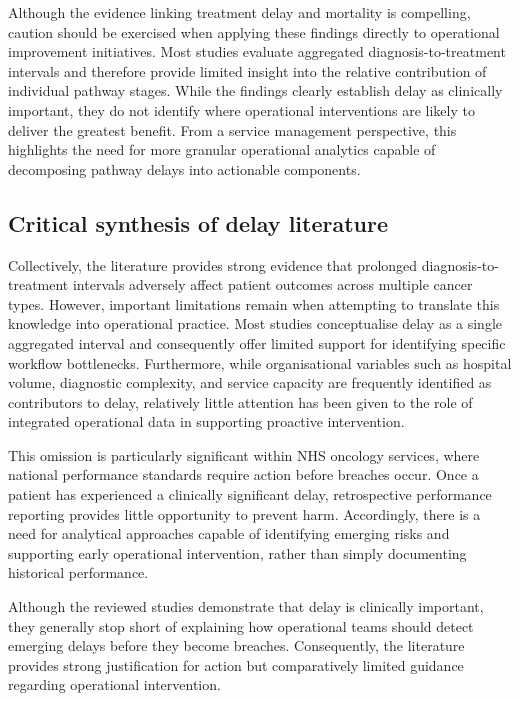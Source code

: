 Although the evidence linking treatment delay and mortality is compelling, caution should be exercised when applying these findings directly to operational improvement initiatives. Most studies evaluate aggregated diagnosis-to-treatment intervals and therefore provide limited insight into the relative contribution of individual pathway stages. While the findings clearly establish delay as clinically important, they do not identify where operational interventions are likely to deliver the greatest benefit. From a service management perspective, this highlights the need for more granular operational analytics capable of decomposing pathway delays into actionable components.

\subsection{Critical synthesis of delay literature}

Collectively, the literature provides strong evidence that prolonged diagnosis-to-treatment intervals adversely affect patient outcomes across multiple cancer types. However, important limitations remain when attempting to translate this knowledge into operational practice. Most studies conceptualise delay as a single aggregated interval and consequently offer limited support for identifying specific workflow bottlenecks. Furthermore, while organisational variables such as hospital volume, diagnostic complexity, and service capacity are frequently identified as contributors to delay, relatively little attention has been given to the role of integrated operational data in supporting proactive intervention.

This omission is particularly significant within NHS oncology services, where national performance standards require action before breaches occur. Once a patient has experienced a clinically significant delay, retrospective performance reporting provides little opportunity to prevent harm. Accordingly, there is a need for analytical approaches capable of identifying emerging risks and supporting early operational intervention, rather than simply documenting historical performance.

Although the reviewed studies demonstrate that delay is clinically important, they generally stop short of explaining how operational teams should detect emerging delays before they become breaches. Consequently, the literature provides strong justification for action but comparatively limited guidance regarding operational intervention.

